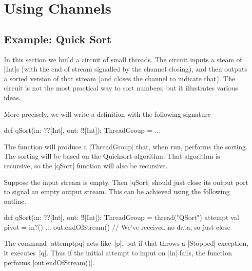 \chapter{Using Channels}

\def\comp#1#2#3{%
  \draw (#1)+(#3,0) node {$\bullet$};
  \draw (#2)+(#3,0) node (n2) {$\bullet$};
  \draw[thick] (#1)+(#3,0) -- (n2.center);
}




\section{Example: Quick Sort}

In this section we build a circuit of small threads.  The circuit inputs a
steam of |Int|s (with the end of stream signalled by the channel closing), and
then outputs a sorted version of that stream (and closes the channel to
indicate that).  The circuit is not the most practical way to sort numbers;
but it illustrates various ideas.

More precisely, we will write a  definition with the following signature
%
\begin{scala}
  def qSort(in: ??[Int], out: !![Int]): ThreadGroup = ...
\end{scala}
%
The function will produce a |ThreadGroup| that, when run, performs the
sorting.  The sorting will be based on the Quicksort algorithm.  That
algorithm is recursive, so the |qSort| function will also be recursive.



Suppose the input stream is empty.  Then |qSort| should just close its output
port to signal an empty output stream.  This can be achieved using the
following outline.
%
\begin{scala}
  def qSort(in: ??[Int], out: !![Int]): ThreadGroup = thread("QSort"){
    attempt{
      val pivot = in?()
      ...
    }{
      out.endOfStream() // We've received no data, so just close
    }
  }
\end{scala}
%
The command |attempt{p}{q}| acts like~|p|, but if that throws a |Stopped|
exception, it executes~|q|.  Thus if the initial attempt to input on |in|
fails, the function performs |out.endOfStream()|.

